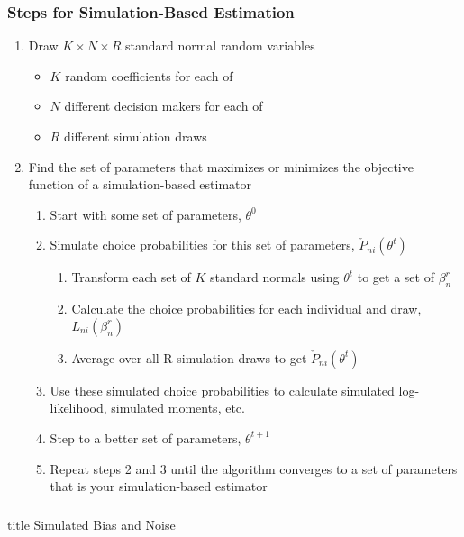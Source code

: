 \documentclass{beamer}
\begin{document}
\begin{frame}\frametitle{Steps for Simulation-Based Estimation}
    \begin{enumerate}
        \item Draw $K \times N \times R$ standard normal random variables
        \begin{itemize}
            \item $K$ random coefficients for each of
            \item $N$ different decision makers for each of
            \item $R$ different simulation draws
        \end{itemize}
        \item Find the set of parameters that maximizes or minimizes the objective function of a simulation-based estimator
        \begin{enumerate}
            \item Start with some set of parameters, $\theta^0$
            \item Simulate choice probabilities for this set of parameters, $\check{P}_{ni}(\theta^t)$
            \begin{enumerate}
                \item Transform each set of $K$ standard normals using $\theta^t$ to get a set of $\beta_n^r$
                \item Calculate the choice probabilities for each individual and draw, $L_{ni}(\beta_n^r)$
                \item Average over all R simulation draws to get $\check{P}_{ni}(\theta^t)$
            \end{enumerate}
            \item Use these simulated choice probabilities to calculate simulated log-likelihood, simulated moments, etc.
            \item Step to a better set of parameters, $\theta^{t + 1}$
            \item Repeat steps 2 and 3 until the algorithm converges to a set of parameters that is your simulation-based estimator
        \end{enumerate}
    \end{enumerate}
\end{frame}

\begin{frame}\frametitle{}
    \vfill
    \centering
    \begin{beamercolorbox}[center]{title}
        \Large Simulated Bias and Noise
    \end{beamercolorbox}
    \vfill
\end{frame}
\end{document}

